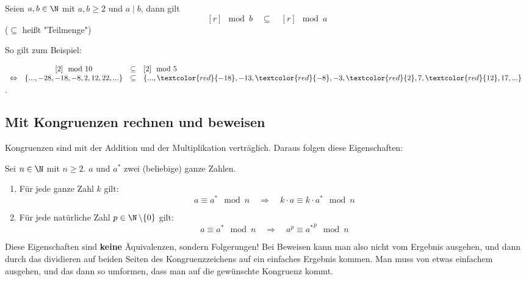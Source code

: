 \documentclass[main.tex]{subfiles}
\begin{document}
\begin{Theorem}
	Seien $a,b \in \N$ mit \quad $a,b \geq 2$ \quad und $a\mid b$, dann gilt
	$$[r] \mod b \quad \subseteq \quad [r] \mod a $$
	($\subseteq$ heißt "Teilmenge")
\end{Theorem}

\begin{Beispiel}
	So gilt zum Beispiel:

	$\begin{array}{rccl}
		& [2] \mod 10 & \subseteq & [2] \mod 5\\
		\Leftrightarrow & \{ ... , -28, -18, -8, 2, 12, 22, ... \} & \subseteq & \{ ..., \textcolor{red}{-18}, -13, \textcolor{red}{-8}, -3, \textcolor{red}{2}, 7, \textcolor{red}{12}, 17, ... \}\
	\end{array}$.
\end{Beispiel}


\subsection{Mit Kongruenzen rechnen und beweisen}

\begin{Definition}
	Kongruenzen sind mit der Addition und der Multiplikation verträglich. Daraus folgen diese Eigenschaften:
	
	Sei $n \in \N$ mit $n \geq 2$. $a$ und $a^{*}$ zwei (beliebige) ganze Zahlen.

	\begin{enumerate}
		\item Für jede ganze Zahl $k$ gilt:
			$$a \equiv a^{*} \mod n \quad \Rightarrow \quad k \cdot a \equiv k \cdot a^{*} \mod n$$
		\item Für jede natürliche Zahl $p \in \N \, \backslash \{0\}$ gilt:
			$$a \equiv a^{*} \mod n \quad \Rightarrow \quad a^p \equiv {a^{*}}^p \mod n$$
	\end{enumerate}
	Diese Eigenschaften sind \textbf{keine} Äquivalenzen, sondern Folgerungen! Bei Beweisen kann man also nicht vom Ergebnis ausgehen, und dann durch das dividieren auf beiden Seiten des Kongruenzzeichens auf ein einfaches Ergebnis kommen. Man muss von etwas einfachem ausgehen, und  das dann so umformen, dass man auf die gewünschte Kongruenz kommt.
\end{Definition}
\end{document}
